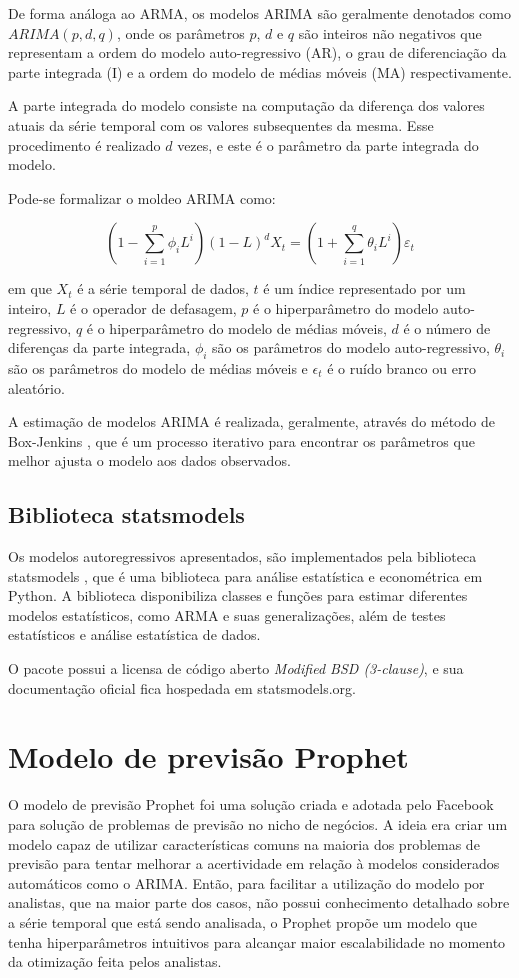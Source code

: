 De forma análoga ao ARMA, os modelos ARIMA são geralmente denotados como $ARIMA(p, d, q)$, onde os parâmetros $p$, $d$ e $q$ são inteiros não negativos que representam a ordem do modelo auto-regressivo (AR), o grau de diferenciação da parte integrada (I) e a ordem do modelo de médias móveis (MA) respectivamente.

A parte integrada do modelo consiste na computação da diferença dos valores atuais da série temporal com os valores subsequentes da mesma. Esse procedimento é realizado $d$ vezes, e este é o parâmetro da parte integrada do modelo.

Pode-se formalizar o moldeo ARIMA como:

\[\left(1-\sum_{i=1}^{p} \phi_{i} L^{i}\right)(1-L)^{d} X_{t}=\left(1+\sum_{i=1}^{q} \theta_{i} L^{i}\right) \varepsilon_{t}\]

em que $X_{t}$ é a série temporal de dados, $t$ é um índice representado por um inteiro, $L$ é o operador de defasagem, $p$ é o hiperparâmetro do modelo auto-regressivo, $q$ é o hiperparâmetro do modelo de médias móveis, $d$ é o número de diferenças da parte integrada, $\phi_{i}$ são os parâmetros do modelo auto-regressivo, $\theta_{i}$ são os parâmetros do modelo de médias móveis e $\epsilon_{t}$ é o ruído branco ou erro aleatório.

A estimação de modelos ARIMA é realizada, geralmente, através do método de Box-Jenkins \cite{box&jenkins}, que é um processo iterativo para encontrar os parâmetros que melhor ajusta o modelo aos dados observados.

\subsection{Biblioteca statsmodels}
Os modelos autoregressivos apresentados, são implementados pela biblioteca statsmodels \cite{seabold2010statsmodels}, que é uma biblioteca para análise estatística e econométrica em Python. A biblioteca disponibiliza classes e funções para estimar diferentes modelos estatísticos, como ARMA e suas generalizações, além de testes estatísticos e análise estatística de dados.

O pacote possui a licensa de código aberto \textit{Modified BSD (3-clause)}, e sua documentação oficial fica hospedada em statsmodels.org.


\section{Modelo de previsão Prophet}
O modelo de previsão Prophet \cite{fbprophet} foi uma solução criada e adotada pelo Facebook para solução de problemas de previsão no nicho de negócios. A ideia era criar um modelo capaz de utilizar características comuns na maioria dos problemas de previsão para tentar melhorar a acertividade em relação à modelos considerados automáticos como o ARIMA. Então, para facilitar a utilização do modelo por analistas, que na maior parte dos casos, não possui conhecimento detalhado sobre a série temporal que está sendo analisada, o Prophet propõe um modelo que tenha hiperparâmetros intuitivos para alcançar maior escalabilidade no momento da otimização feita pelos analistas.

